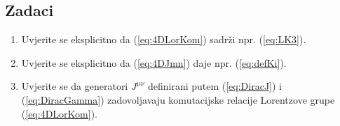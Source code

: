 \subsection*{Zadaci}

\begin{enumerate}[label=\arabic{chapter}.\arabic*.]

\item Uvjerite se eksplicitno da (\ref{eq:4DLorKom}) sadrži npr. (\ref{eq:LK3}).

\item Uvjerite se eksplicitno da (\ref{eq:4DJmn}) daje npr. (\ref{eq:defKi}).

\item Uvjerite se da generatori $J^{\mu\nu}$ definirani putem
(\ref{eq:DiracJ}) i (\ref{eq:DiracGamma}) zadovoljavaju komutacijske
relacije Lorentzove grupe (\ref{eq:4DLorKom}).

\end{enumerate}
